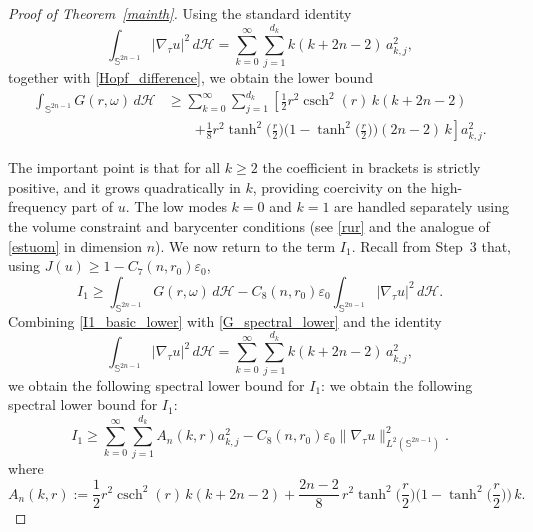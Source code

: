 \documentclass[10pt,a4paper]{amsart}
\newcommand{\csch}{\operatorname{csch}}
\def\ge{\geqslant}
\begin{document}
\begin{proof}[Proof of Theorem~\ref{mainth}]
\smallskip
Using the standard identity
\[
\int_{\mathbb S^{2n-1}}|\nabla_\tau u|^2\,d\mathcal H
=\sum_{k=0}^\infty\sum_{j=1}^{d_k} k(k+2n-2)\,a_{k,j}^2,
\]
together with \eqref{Hopf_difference}, we obtain the lower bound
\begin{equation}\label{G_spectral_lower}
\begin{split}
\int_{\mathbb S^{2n-1}} G(r,\omega)\, d\mathcal H
&\ge
\sum_{k=0}^\infty \sum_{j=1}^{d_k}
\left[
\frac12 r^2 \csch^2(r)\, k(k+2n-2)
\right.
\\
&\qquad\left.
+\frac18 r^2 \tanh^2\!\Big(\frac r2\Big)\Big(1-\tanh^2\!\Big(\frac r2\Big)\Big)
(2n-2)\, k
\right] a_{k,j}^2 .
\end{split}
\end{equation}


\smallskip
The important point is that for all $k\ge 2$ the coefficient in brackets is strictly positive,
and it grows quadratically in $k$, providing coercivity on the high-frequency part of $u$.
The low modes $k=0$ and $k=1$ are handled separately using the volume constraint and barycenter
conditions (see \eqref{rur} and the analogue of \eqref{estuom} in dimension $n$).
\smallskip
We now return to the term $I_1$. Recall from Step~3 that, using $J(u)\ge 1-C_7(n,r_0)\varepsilon_0$,
\begin{equation}\label{I1_basic_lower}
I_1 \ge \int_{\mathbb S^{2n-1}} G(r,\omega)\,d\mathcal H
- C_8(n,r_0)\varepsilon_0\int_{\mathbb S^{2n-1}}|\nabla_\tau u|^2\,d\mathcal H.
\end{equation}
Combining \eqref{I1_basic_lower} with \eqref{G_spectral_lower} and the identity
\[
\int_{\mathbb S^{2n-1}}|\nabla_\tau u|^2\,d\mathcal H
=\sum_{k=0}^\infty\sum_{j=1}^{d_k}k(k+2n-2)\,a_{k,j}^2,
\]
we obtain the following spectral lower bound for $I_1$:
we obtain the following spectral lower bound for $I_1$:
\begin{equation}\label{I1K_general}
I_1
\ge
\sum_{k=0}^\infty\sum_{j=1}^{d_k}A_n(k,r)a_{k,j}^2
- C_8(n,r_0)\varepsilon_0\|\nabla_\tau u\|_{L^2(\mathbb S^{2n-1})}^2.
\end{equation}
where
\[
A_n(k,r):=
\frac12 r^2 \csch^2(r)\,k(k+2n-2)
+\frac{2n-2}{8}\, r^2 \tanh^2\!\Big(\frac r2\Big)
\Big(1-\tanh^2\!\Big(\frac r2\Big)\Big)\,k .
\]


\medskip


\end{proof}
\end{document}
